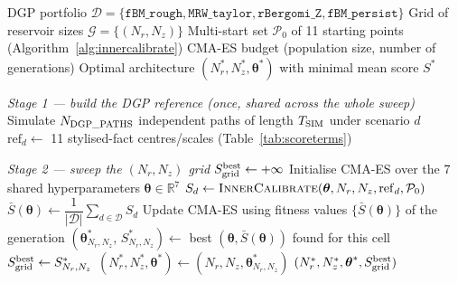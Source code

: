 \documentclass[11pt,a4paper]{article}
\begin{document}
\begin{algorithm}[H]
\caption{ESN Grid-Matrix Hyperparameter Search}
\label{alg:gridsearch}
\begin{algorithmic}[1]
\Require DGP portfolio $\mathcal{D} = \{\texttt{fBM\_rough}, \texttt{MRW\_taylor}, \texttt{rBergomi\_Z}, \texttt{fBM\_persist}\}$
\Require Grid of reservoir sizes $\mathcal{G} = \{(N_r, N_z)\}$
\Require Multi-start set $\mathcal{P}_0$ of 11 starting points (Algorithm~\ref{alg:innercalibrate})
\Require CMA-ES budget (population size, number of generations)
\Ensure Optimal architecture $(N_r^\ast, N_z^\ast, \boldsymbol{\theta}^\ast)$ with minimal mean score $S^\ast$

\Statex
\Statex \textit{Stage 1 --- build the DGP reference (once, shared across the whole sweep)}
    \State Simulate $N_{\rm DGP\_PATHS}$ independent paths of length $T_{\rm SIM}$ under scenario $d$
    \State $\mathrm{ref}_d \gets$ 11 stylised-fact centres/scales (Table~\ref{tab:scoreterms})
\EndFor

\Statex
\Statex \textit{Stage 2 --- sweep the $(N_r,N_z)$ grid}
\State $S^{\rm best}_{\rm grid} \gets +\infty$
    \State Initialise CMA-ES over the 7 shared hyperparameters $\boldsymbol{\theta} \in \mathbb{R}^7$
                \State $S_d \gets \Call{InnerCalibrate}{\boldsymbol{\theta}, N_r, N_z, \mathrm{ref}_d, \mathcal{P}_0}$
            \EndFor
            \State $\bar S(\boldsymbol{\theta}) \gets \dfrac{1}{|\mathcal{D}|}\sum_{d \in \mathcal{D}} S_d$ 
        \EndFor
        \State Update CMA-ES using fitness values $\{\bar S(\boldsymbol{\theta})\}$ of the generation
    \EndWhile
    \State $(\boldsymbol{\theta}^\ast_{N_r,N_z},\, S^\ast_{N_r,N_z}) \gets$ best $(\boldsymbol{\theta}, \bar S(\boldsymbol{\theta}))$ found for this cell
        \State $S^{\rm best}_{\rm grid} \gets S^\ast_{N_r,N_z}$
        \State $(N_r^\ast, N_z^\ast, \boldsymbol{\theta}^\ast) \gets (N_r, N_z, \boldsymbol{\theta}^\ast_{N_r,N_z})$
    \EndIf
\EndFor
\State \Return $(N_r^\ast, N_z^\ast, \boldsymbol{\theta}^\ast, S^{\rm best}_{\rm grid})$
\end{algorithmic}
\end{algorithm}
\end{document}
